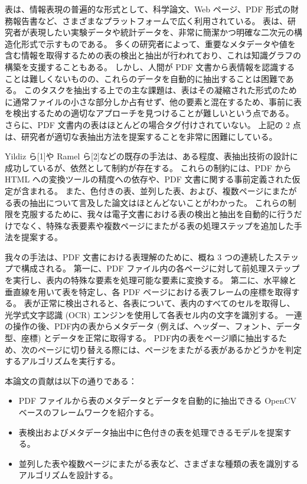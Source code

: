 \documentclass[uplatex, twocolumn,10pt]{jsarticle}
\begin{document}
表は、情報表現の普遍的な形式として、科学論文、Web ページ、PDF 形式の財務報告書など、さまざまなプラットフォームで広く利用されている。
表は、研究者が表現したい実験データや統計データを、非常に簡潔かつ明確な二次元の構造化形式で示すものである。
多くの研究者によって、重要なメタデータや値を含む情報を取得するための表の検出と抽出が行われており、これは知識グラフの構築を支援することもある。
しかし、人間が PDF 文書から表情報を認識することは難しくないものの、これらのデータを自動的に抽出することは困難である。
このタスクを抽出する上での主な課題は、表はその凝縮された形式のために通常ファイルの小さな部分しか占有せず、他の要素と混在するため、事前に表を検出するための適切なアプローチを見つけることが難しいという点である。
さらに、PDF 文書内の表はほとんどの場合タグ付けされていない。
上記の 2 点は、研究者が適切な表抽出方法を提案することを非常に困難にしている。

Yildiz ら[1]や Ramel ら[2]などの既存の手法は、ある程度、表抽出技術の設計に成功しているが、依然として制約が存在する。
これらの制約には、PDF から HTML への変換ツールの精度への依存や、PDF 文書に関する事前定義された仮定が含まれる。
また、色付きの表、並列した表、および、複数ページにまたがる表の抽出について言及した論文はほとんどないことがわかった。
これらの制限を克服するために、我々は電子文書における表の検出と抽出を自動的に行うだけでなく、特殊な表要素や複数ページにまたがる表の処理ステップを追加した手法を提案する。

我々の手法は、PDF 文書における表理解のために、概ね 3 つの連続したステップで構成される。
第一に、PDF ファイル内の各ページに対して前処理ステップを実行し、表内の特殊な要素を処理可能な要素に変換する。
第二に、水平線と垂直線を用いて表を特定し、各 PDF ページにおける表フレームの座標を取得する。
表が正常に検出されると、各表について、表内のすべてのセルを取得し、光学式文字認識 (OCR) エンジンを使用して各表セル内の文字を識別する。
一連の操作の後、PDF内の表からメタデータ (例えば、ヘッダー、フォント、データ型、座標) とデータを正常に取得する。
PDF内の表をページ順に抽出するため、次のページに切り替える際には、ページをまたがる表があるかどうかを判定するアルゴリズムを実行する。

本論文の貢献は以下の通りである：
\begin{itemize}
    \item PDF ファイルから表のメタデータとデータを自動的に抽出できる OpenCV ベースのフレームワークを紹介する。
    \item 表検出およびメタデータ抽出中に色付きの表を処理できるモデルを提案する。
    \item 並列した表や複数ページにまたがる表など、さまざまな種類の表を識別するアルゴリズムを設計する。
\end{itemize}
\end{document}
